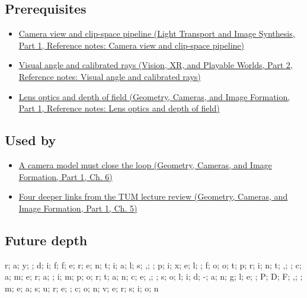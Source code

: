 \subsection{Prerequisites}\label{appendix-8c40fad29462-prerequisites}

\hypertarget{appendix-8c40fad29462-prerequisites}{}

\begin{itemize}
\tightlist
\item
  \href{../04-Light-Transport-and-Image-Synthesis-P01/main.pdf\#appendix-1c07d64f5e70}{Camera view and clip-space pipeline (Light Transport and Image Synthesis, Part 1, Reference notes: Camera view and clip-space pipeline)}
\item
  \href{../07-Vision-XR-and-Playable-Worlds-P02/main.pdf\#appendix-7d356c396d1a}{Visual angle and calibrated rays (Vision, XR, and Playable Worlds, Part 2, Reference notes: Visual angle and calibrated rays)}
\item
  \href{../03-Geometry-Cameras-and-Image-Formation-P01/main.pdf\#appendix-21f8456e2629}{Lens optics and depth of field (Geometry, Cameras, and Image Formation, Part 1, Reference notes: Lens optics and depth of field)}
\end{itemize}

\subsection{Used by}\label{appendix-8c40fad29462-used-by}

\hypertarget{appendix-8c40fad29462-used-by}{}

\begin{itemize}
\tightlist
\item
  \href{../03-Geometry-Cameras-and-Image-Formation-P01/main.pdf\#02-foundations-ii-ch037-a-camera-model-must-close-the-loop}{A camera model must close the loop (Geometry, Cameras, and Image Formation, Part 1, Ch. 6)}
\item
  \href{../03-Geometry-Cameras-and-Image-Formation-P01/main.pdf\#02-foundations-ii-ch036-four-deeper-links-from-the-tum-lecture-review}{Four deeper links from the TUM lecture review (Geometry, Cameras, and Image Formation, Part 1, Ch. 5)}
\end{itemize}

\subsection{Future depth}\label{appendix-8c40fad29462-future-depth}

\hypertarget{appendix-8c40fad29462-future-depth}{}

r; a; y; ; d; i; f; f; e; r; e; n; t; i; a; l; s; ,; ; p; i; x; e; l; ; f; o; o; t; p; r; i; n; t; ,; ; c; a; m; e; r; a; ; i; m; p; o; r; t; a; n; c; e; ,; ; s; o; l; i; d; -; a; n; g; l; e; ; P; D; F; ,; ; m; e; a; s; u; r; e; ; c; o; n; v; e; r; s; i; o; n
